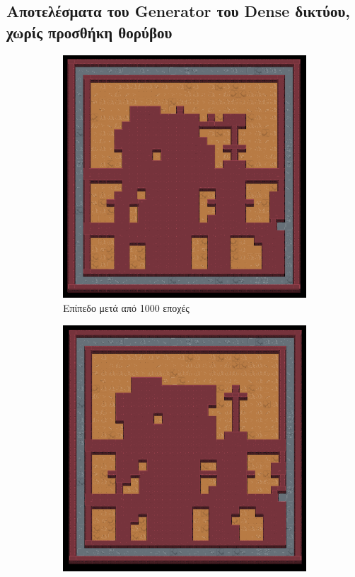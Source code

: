 \subsection{Αποτελέσματα του Generator του Dense δικτύου, χωρίς προσθήκη θορύβου}
\begin{figure}[H]
\begin{subfigure}{.5\textwidth}
  \centering
  \includegraphics[width=.8\linewidth]{../images/result_images/dense-gan/generator_1000.png}
  \caption{Επίπεδο μετά από 1000 εποχές}
  \label{fig:sfig1}
\end{subfigure}%
\begin{subfigure}{.5\textwidth}
  \centering
  \includegraphics[width=.8\linewidth]{../images/result_images/dense-gan/generator_3000.png}

\end{subfigure}
\end{figure}

